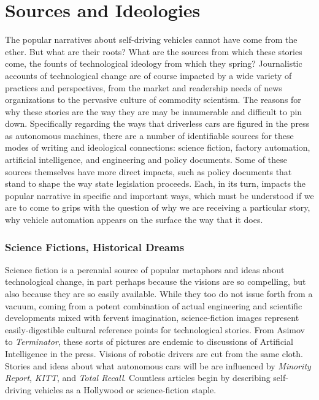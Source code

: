 \chapter{Sources and Ideologies}




The popular narratives about self-driving vehicles cannot have come from
the ether. But what are their roots? What are the sources from which
these stories come, the founts of technological ideology from which
they spring? Journalistic accounts of technological change are of
course impacted by a wide variety of practices and perspectives, from
the market and readership needs of news organizations to the pervasive
culture of commodity scientism.\cite{???-smithCommodityScientism} The
reasons for why these stories are the way they are may be innumerable
and difficult to pin down. Specifically regarding the ways that
driverless cars are figured in the press as autonomous machines, there
are a number of identifiable sources for these modes of writing and
ideological connections: science fiction, factory automation,
artificial intelligence, and engineering and policy documents. Some of
these sources themselves have more direct impacts, such as
policy documents that stand to shape the way state legislation proceeds. Each,
in its turn, impacts the popular narrative in specific and important
ways, which must be understood if we are to come to grips with the
question of why we are receiving a particular story, why vehicle
automation appears on the surface the way that it does.

\subsection{Science Fictions, Historical Dreams}

Science fiction is a perennial source of popular metaphors and ideas
about technological change, in part perhaps because the visions are so
compelling, but also because they are so easily available. While they
too do not issue forth from a vacuum, coming from a potent combination
of actual engineering and scientific developments mixed with fervent imagination,
science-fiction images represent easily-digestible cultural reference
points for technological stories. From Asimov to \emph{Terminator},
these sorts of pictures are endemic to discussions of Artificial
Intelligence in the press. Visions of robotic drivers are cut from the
same cloth. Stories and ideas about what autonomous cars will be are
influenced by \emph{Minority Report}, \emph{KITT}, and \emph{Total
  Recall}.\cite{???} Countless articles begin by describing
self-driving vehicles as a Hollywood or science-fiction
staple.\cite{???-http://seekingalpha.com/article/2798325-a-window-into-a-driverless-future-from-science-fiction-to-reality} 

